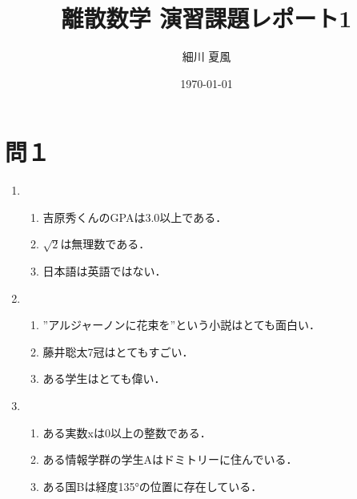 \documentclass[uplatex]{jsarticle}
\title{離散数学 演習課題レポート1}
\author{細川 夏風}
\date{\today}
\begin{document}
\maketitle

\newpage

\section{問１}
\renewcommand{\theenumi}{(\arabic{enumi})}
\begin{enumerate}
\vspace{12pt}

\item 
	\begin{enumerate}
		\item 吉原秀くんのGPAは3.0以上である．
		\item $\sqrt{2}$は無理数である．
		\item 日本語は英語ではない．
	\end{enumerate}

\vspace{12pt}

\item
	\begin{enumerate}
		\item ''アルジャーノンに花束を''という小説はとても面白い．
		\item 藤井聡太7冠はとてもすごい．
		\item ある学生はとても偉い．
	\end{enumerate}
\vspace{12pt}

\item
	\begin{enumerate}
		\item ある実数xは0以上の整数である．
		\item ある情報学群の学生Aはドミトリーに住んでいる．
		\item ある国Bは経度135°の位置に存在している．
	\end{enumerate}

\end{enumerate}
\end{document}
